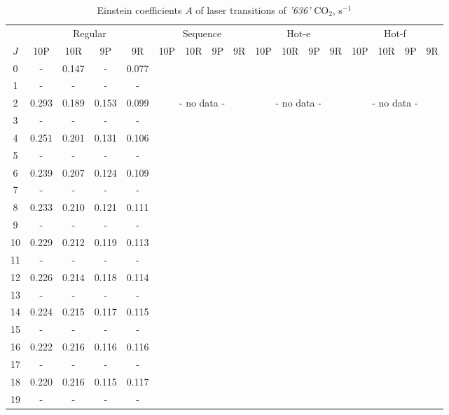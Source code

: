 \documentclass{report}
\begin{document}
\begin{appendices}
\begin{table}
\centering
\caption{Einstein coefficients $A$ of laser transitions of \textit{'636'} {CO$_2$}, s$^{-1}$}
\label{table:A636}
\scriptsize
\begin{tabular}{|c|cccc|cccc|cccc|cccc|}
\hline
& \multicolumn{4}{c|}{Regular}& \multicolumn{4}{c|}{Sequence}& \multicolumn{4}{c|}{Hot-e}& \multicolumn{4}{c|}{Hot-f}\\
$J$ & 10P & 10R & 9P & 9R & 10P & 10R & 9P & 9R & 10P & 10R & 9P & 9R & 10P & 10R & 9P & 9R\\ 
\hline
0  &   -   & 0.147 &   -   & 0.077 & & & & & & & & & & & &\\
1  &   -   &   -   &   -   &   -   & & & & & & & & & & & &\\
2  & 0.293 & 0.189 & 0.153 & 0.099 & \multicolumn{4}{c|}{- no data -}& \multicolumn{4}{c|}{- no data -}& \multicolumn{4}{c|}{- no data -}\\
3  &   -   &   -   &   -   &   -   & & & & & & & & & & & &\\
4  & 0.251 & 0.201 & 0.131 & 0.106 & & & & & & & & & & & &\\
5  &   -   &   -   &   -   &   -   & & & & & & & & & & & &\\
6  & 0.239 & 0.207 & 0.124 & 0.109 & & & & & & & & & & & &\\
7  &   -   &   -   &   -   &   -   & & & & & & & & & & & &\\
8  & 0.233 & 0.210 & 0.121 & 0.111 & & & & & & & & & & & &\\
9  &   -   &   -   &   -   &   -   & & & & & & & & & & & &\\
10 & 0.229 & 0.212 & 0.119 & 0.113 & & & & & & & & & & & &\\
11 &   -   &   -   &   -   &   -   & & & & & & & & & & & &\\
12 & 0.226 & 0.214 & 0.118 & 0.114 & & & & & & & & & & & &\\
13 &   -   &   -   &   -   &   -   & & & & & & & & & & & &\\
14 & 0.224 & 0.215 & 0.117 & 0.115 & & & & & & & & & & & &\\
15 &   -   &   -   &   -   &   -   & & & & & & & & & & & &\\
16 & 0.222 & 0.216 & 0.116 & 0.116 & & & & & & & & & & & &\\
17 &   -   &   -   &   -   &   -   & & & & & & & & & & & &\\
18 & 0.220 & 0.216 & 0.115 & 0.117 & & & & & & & & & & & &\\
19 &   -   &   -   &   -   &   -   & & & & & & & & & & & &\\

\end{tabular}
\end{table}
\end{appendices}
\end{document}
